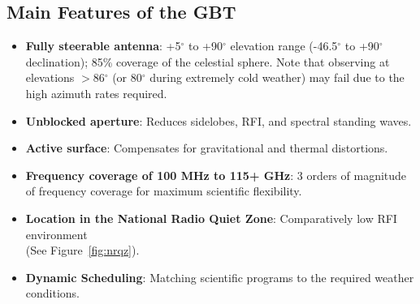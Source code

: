 \newpage

\subsection{Main Features of the GBT}


\begin{itemize}[leftmargin=*,itemsep=1pt]
\item {\bf Fully steerable antenna}: +5$^\circ$ to +90$^\circ$ elevation range 
(-46.5$^\circ$ to +90$^\circ$ declination); 85\% coverage of the celestial sphere.  
Note that observing at elevations $>$86$^\circ$ (or 80$^\circ$ during extremely
cold weather) may fail due to the high azimuth rates required.
\item {\bf Unblocked aperture}: Reduces sidelobes, \gls{RFI}, and spectral standing waves.
\item {\bf Active surface}: Compensates for gravitational and thermal distortions.
\item {\bf Frequency coverage of 100 MHz to 115+ GHz}: 3 orders of magnitude of
frequency coverage for maximum scientific flexibility.
\item {\bf Location in the National Radio Quiet Zone}: Comparatively low \gls{RFI}
environment\\ (See Figure~\ref{fig:nrqz}).
\item {\bf Dynamic Scheduling}: Matching scientific programs to the required
weather conditions.
\end{itemize}


